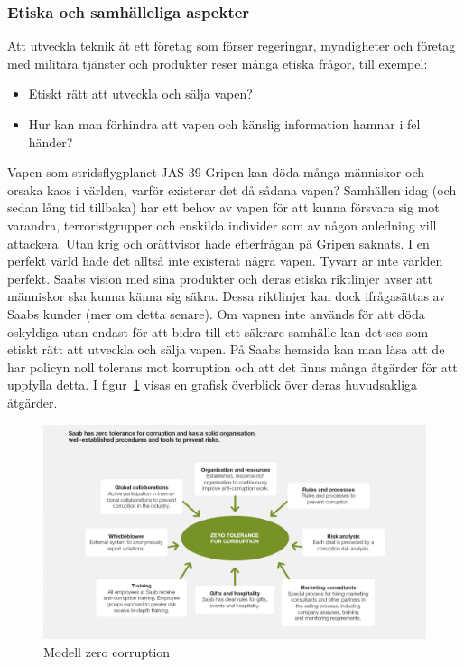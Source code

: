 \subsubsection{Etiska och samhälleliga aspekter}
Att utveckla teknik åt ett företag som förser regeringar, myndigheter och företag med militära tjänster och produkter reser många etiska frågor, till exempel: 
\begin{itemize}
\item Etiskt rätt att utveckla och sälja vapen?
\item Hur kan man förhindra att vapen och känslig information hamnar i fel händer? 
\end{itemize} 
Vapen som stridsflygplanet JAS 39 Gripen kan döda många människor och orsaka kaos i världen, varför existerar det då sådana vapen? Samhällen idag (och sedan lång tid tillbaka) har ett behov av vapen för att kunna försvara sig mot varandra, terroristgrupper och enskilda individer som av någon anledning vill attackera. Utan krig och orättvisor hade efterfrågan på Gripen saknats. I en perfekt värld hade det alltså inte existerat några vapen. Tyvärr är inte världen perfekt. 
\newline
\newline
Saabs vision med sina produkter och deras etiska riktlinjer avser att människor ska kunna känna sig säkra. Dessa riktlinjer kan dock ifrågasättas av Saabs kunder (mer om detta senare). Om vapnen inte används för att döda oskyldiga utan endast för att bidra till ett säkrare samhälle kan det ses som etiskt rätt att utveckla och sälja vapen. 
\newline
\newline   
På Saabs hemsida kan man läsa att de har policyn noll tolerans mot korruption och att det finns många åtgärder för att uppfylla detta. I figur~\ref{fig:zerotolerance} visas en grafisk överblick över deras huvudsakliga åtgärder. 
\leavevmode
\begin{figure}[h]
	\centering
	\includegraphics[scale=1.4]{grafik/modell_zero_corruption_1140x640.png}
	\caption{Modell zero corruption \citep{saabimg1}}\label{fig:zerotolerance}
\end{figure}  
